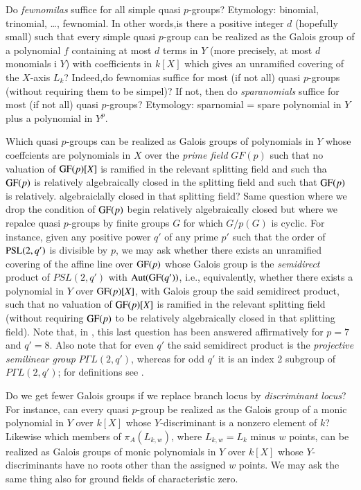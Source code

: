 \begin{question}\label{art1-qus9.2}
Do \textit{fewnomilas} suffice for all simple quasi $p$-groups? Etymology: binomial, trinomial, \ldots, fewnomial. In other words,is there a positive integer $d$ (hopefully small) such that every simple quasi $p$-group can be realized as the Galois group of a polynomial $f$ containing at most $d$ terms in $Y$ (more precisely, at most $d$ monomials i $Y$)
 with coefficients in $k[X]$ which gives an unramified covering of the $X$-axis $L_{k}$? Indeed,do fewnomias suffice for most (if not all) quasi $p$-groups (without requiring them to be simpel)? If not, then do \textit{sparanomials} suffice for most (if not all) quasi $p$-groups? Etymology: sparnomial = spare polynomial in $Y$ plus a polynomial in $Y^{p}$.
\end{question}

\begin{question}\label{art1-qus9.3}
Which quasi $p$-groups can be realized as Galois groups of polynomials in $Y$ whose coeffcients are polynomials in $X$ over the \textit{prime field} $GF(p)$ such that no valuation of $\operatorname{GF}(p)[X]$ is ramified in the relevant splitting field and such tha $\operatorname{GF}(p)$ is relatively algebraically closed in the splitting field and such that $\operatorname{GF}(p)$ is relatively. algebraiclally closed in that splitting field? Same question where we drop the condition of $\operatorname{GF}(p)$ begin relatively algebraically closed but where we repalce quasi $p$-groups by finite groups  $G$ for which $G/p(G)$ is cyclic. For instance, given any positive power $q'$ of any prime $p'$ such that the order of $\operatorname{PSL}(2,q')$ is divisible by $p$, we may ask whether there exists an unramified covering of the affine line over $\operatorname{GF}(p)$ whose Galois group is the \textit{semidirect} product of $PSL(2,q')$ with $\operatorname{Aut}(\operatorname{GF}(q'))$, i.e., equivalently, whether there exists a polynomial in $Y$ over $\operatorname{GF}(p)[X]$, with Galois group the said semidirect product, such that no valuation of $\operatorname{GF}(p)[X]$ is ramified in the relevant splitting field (without requiring $\operatorname{GF}(p)$ to be relatively algebraically closed in that splitting field). Note that, in \cite{art1-key9}, this last question has been answered affirmatively for $p=7$ and $q' =8$. Also note that for even $q'$ the said semidirect product is the \textit{projective semilinear group} $P\Gamma L(2,q')$, whereas for odd $q'$ it is an index 2 subgroup of $P\Gamma L(2,q')$; for definitions see \cite{art1-key8}.
\end{question}

\begin{question}\label{art1-qus9.4}
Do we get fewer Galois groups if we replace branch locus by \textit{discriminant locus}? For instance, can every quasi
$p$-group be realized as the Galois group of a monic polynomial in $Y$ over $k[X]$ whose $Y$-discriminant is a nonzero element of $k$? Likewise which members of $\pi_{A}(L_{k,w})$, where $L_{k,w} = L_{k}$ minus $w$ points, can be realized as Galois groups of monic polynomials in $Y$ over $k[X]$ whose $Y$-discriminants have no roots other than the assigned $w$ points. We may ask the same thing also for ground fields of characteristic zero.
\end{question}

